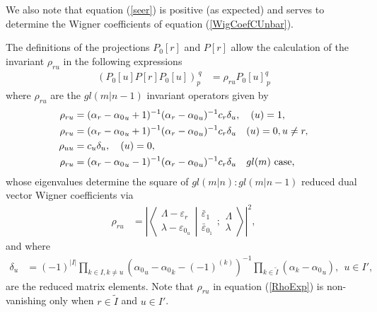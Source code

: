 \documentclass[12pt]{article}
\def\nn{\nonumber}
\begin{document}
We also note that equation (\ref{seer}) is positive (as expected) and serves to determine the Wigner coefficients of equation (\ref{WigCoefCUnbar}).

The definitions of the projections ${P_0}[r]$ and ${P}[r]$ allow the calculation of the invariant ${\rho}_{ru}$ in the following expressions \cite{GIW2}
\begin{align}
({P_0}[u]{P}[r]{P_0}[u])_p^{\ q} &= {\rho}_{ru}{P_0}[u]_{\ p}^q 
\end{align}
where ${\rho}_{ru}$ are the $gl(m|n-1)$ invariant operators given by
\begin{align}
{\rho}_{ru} &= ({\alpha}_r-{\alpha_0}_u +
1)^{-1}({\alpha}_r-{\alpha_0}_u)^{-1}{c}_r{\delta}_u, \ \ \ (u) = 1, \nn\\
{\rho}_{ru} &= ({\alpha}_r-{\alpha_0}_u +
1)^{-1}({\alpha}_r-{\alpha_0}_u)^{-1}{c}_r{\delta}_u \ \ \ (u) = 0, u \neq r,
\nn\\
{\rho}_{uu} &= {c}_u {\delta}_u, \ \ \ (u) = 0, \nn\\
{\rho}_{ru} &= ({\alpha}_r-{\alpha_0}_u -
1)^{-1}({\alpha}_r-{\alpha_0}_u)^{-1}{c}_r {\delta}_u \ \ \ gl(m)
\hbox{~case,} 
\label{RhoExp}
\end{align}
whose eigenvalues determine the square of $gl(m|n):gl(m|n-1)$ reduced dual vector Wigner
coefficients via
\begin{align}
\rho_{ru} &= \left| \left\langle\left. 
\begin{array}{c} \Lambda-\varepsilon_r\\ \lambda-\varepsilon_{0_u} \end{array}
\right|\right.
\left.
\begin{array}{c} \bar{\varepsilon}_1 \\
\bar{\varepsilon}_{0_1}  \end{array}  ; \begin{array}{c} \Lambda \\
\lambda \end{array}
\right\rangle \nn \right|^2,
\end{align}
and where
\begin{align}
\delta_u &= (-1)^{|I|} \prod_{k\in I,k\neq u} \left({\alpha_0}_u - {\alpha_0}_k -
(-1)^{(k)}\right)^{-1}\prod_{k\in\tilde{I}} \left(\alpha_k - {\alpha_0}_u \right),\ \ u\in I',
\end{align}
are the reduced matrix elements.
Note that ${\rho}_{ru}$ in equation (\ref{RhoExp}) is non-vanishing only when $r\in \tilde{I}$ and $u\in I'$.
\end{document}

